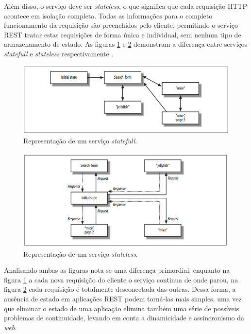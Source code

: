 Além disso, o serviço deve ser \textit{stateless}, o que significa que cada requisição HTTP acontece em isolação completa. Todas as informações para o completo funcionamento da requisição são preenchidos pelo cliente, permitindo o serviço REST tratar estas requisições de forma única e individual, sem nenhum tipo de armazenamento de estado. As figuras \ref{statefull} e \ref{stateless} demonstram a diferença entre serviços \textit{statefull} e \textit{stateless} respectivamente \cite{richardson2008restful}.

\begin{figure}[htp]
	\caption{\label{statefull}Representação de um serviço \textit{statefull}.}
	\begin{center}
		\includegraphics[scale=0.8]{images/statefull.png}
	\end{center}
\end{figure}

\begin{figure}[htp]
	\caption{\label{stateless}Representação de um serviço \textit{stateless}.}
	\begin{center}
		\includegraphics[scale=1]{images/stateless.png}
	\end{center}
\end{figure}

Analisando ambas as figuras nota-se uma diferença primordial: enquanto na figura \ref{statefull} a cada nova requisição do cliente o serviço continua de onde parou, na figura \ref{stateless} cada requisição é totalmente desconectada das outras. Dessa forma, a ausência de estado em aplicações REST podem torná-las mais simples, uma vez que eliminar o estado de uma aplicação elimina também uma série de possíveis problemas de continuidade, levando em conta a dinamicidade e assincronismo da \textit{web}.

